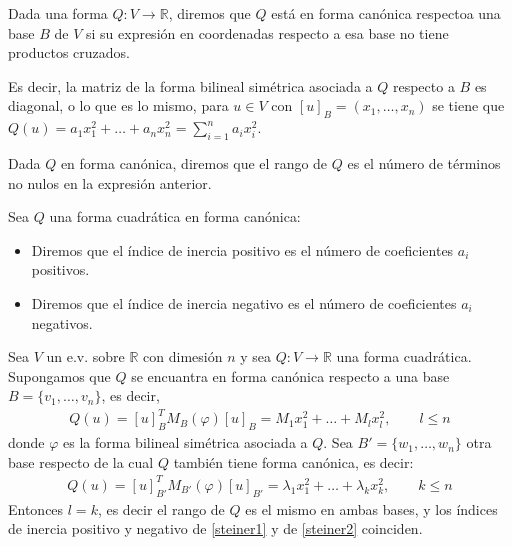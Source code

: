 \documentclass[14pt]{book}
\begin{document}

\begin{dfn}
	Dada una forma $Q: V \to \mathbb{R}$, diremos que $Q$ está en forma canónica respectoa una base $B$ de $V$ si su expresión en coordenadas respecto a esa base no tiene productos cruzados.
	
	Es decir, la matriz de la forma bilineal simétrica asociada a $Q$ respecto a $B$ es diagonal, o lo que es lo mismo, para $u \in V$ con $[u]_B = (x_1, \dots, x_n)$ se tiene que $Q(u) = a_1x_1^2 + \dots + a_nx_n^2 = \sum_{i = 1}^n a_i x_i^2$.
\end{dfn}

\begin{dfn}
	Dada $Q$ en forma canónica, diremos que el rango de $Q$ es el número de términos no nulos en la expresión anterior.
\end{dfn}

\begin{dfn}
	Sea $Q$ una forma cuadrática en forma canónica:
	\begin{itemize}
		\item Diremos que el índice de inercia positivo es el número de coeficientes $a_i$ positivos.
		\item Diremos que el índice de inercia negativo es el número de coeficientes $a_i$ negativos.
	\end{itemize}
\end{dfn}

\begin{tm}[de Steiner]
	Sea $V$ un e.v. sobre $\mathbb{R}$ con dimesión $n$ y sea $Q: V \to \mathbb{R}$ una forma cuadrática. Supongamos que $Q$ se encuantra en forma canónica respecto a una base $B=\{v_1, \dots, v_n\}$, es decir,
	\begin{align}
		\label{steiner1}
		Q(u) = [u]_B^T M_B(\varphi)[u]_B = M_1 x_1^2 + \dots + M_l x_l^2,\qquad l \leq n
	\end{align}
	donde $\varphi$ es la forma bilineal simétrica asociada a $Q$. Sea $B' = \{w_1, \dots, w_n\}$ otra base respecto de la cual $Q$ también tiene forma canónica, es decir:
	\begin{align}
		\label{steiner2}
		Q(u) = [u]_{B'}^T M_{B'}(\varphi) [u]_{B'} = \lambda_1 x_1^2 + \dots + \lambda_k x_k^2,\qquad k \leq n
	\end{align}
	Entonces $l = k$, es decir el rango de $Q$ es el mismo en ambas bases, y los índices de inercia positivo y negativo de \eqref{steiner1} y de \eqref{steiner2} coinciden.
\end{tm}
\end{document}
